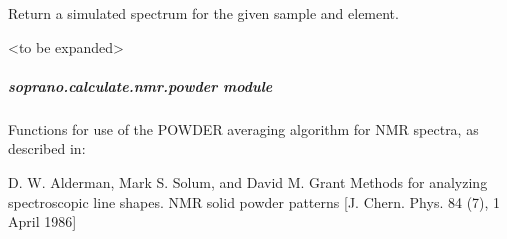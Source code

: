 \documentclass[letterpaper,10pt,english]{sphinxmanual}
\begin{document}
\begin{fulllineitems}

\begin{fulllineitems}
\label{doctree/soprano.calculate.nmr.nmr:soprano.calculate.nmr.nmr.NMRCalculator.spectrum_1d}
Return a simulated spectrum for the given sample and element.

\textless{}to be expanded\textgreater{}

\end{fulllineitems}


\end{fulllineitems}



\subparagraph{soprano.calculate.nmr.powder module}
\label{doctree/soprano.calculate.nmr.powder:soprano-calculate-nmr-powder-module}\label{doctree/soprano.calculate.nmr.powder::doc}\label{doctree/soprano.calculate.nmr.powder:module-soprano.calculate.nmr.powder}
Functions for use of the POWDER averaging algorithm for NMR spectra,
as described in:

D. W. Alderman, Mark S. Solum, and David M. Grant
Methods for analyzing spectroscopic line shapes. NMR solid powder patterns
{[}J. Chern. Phys. 84 (7), 1 April 1986{]}
\end{document}
